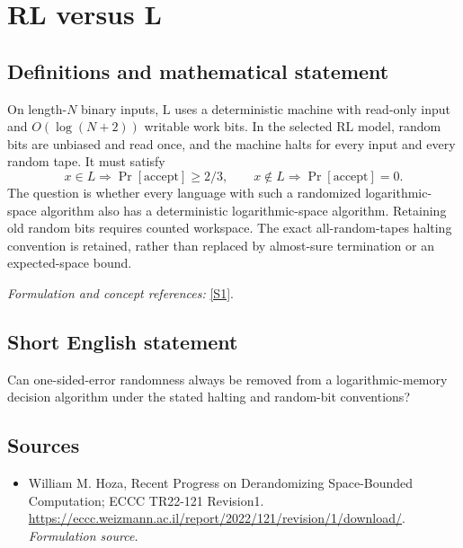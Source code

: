 \documentclass[11pt]{article}
\begin{document}
\section*{\texorpdfstring{RL versus L}{RL versus L}}\label{30006815}
\subsection{Definitions and mathematical statement}
On length-$N$ binary inputs, $\mathrm L$ uses a deterministic machine with read-only input and $O(\log(N+2))$ writable work bits. In the selected $\mathrm{RL}$ model, random bits are unbiased and read once, and the machine halts for every input and every random tape. It must satisfy
\[
 x\in L\Rightarrow\Pr[\mathrm{accept}]\ge2/3,
 \qquad x\notin L\Rightarrow\Pr[\mathrm{accept}]=0.
\]
The question is whether every language with such a randomized logarithmic-space algorithm also has a deterministic logarithmic-space algorithm. Retaining old random bits requires counted workspace. The exact all-random-tapes halting convention is retained, rather than replaced by almost-sure termination or an expected-space bound.
\par\smallskip\textit{Formulation and concept references:} \href{https://eccc.weizmann.ac.il/report/2022/121/revision/1/download/}{[S1]}.

\subsection{Short English statement}
Can one-sided-error randomness always be removed from a logarithmic-memory decision algorithm under the stated halting and random-bit conventions?
\subsection{Sources}
\begin{itemize}
\item[S1]William M. Hoza, Recent Progress on Derandomizing Space-Bounded Computation; ECCC TR22-121 Revision1.
\url{https://eccc.weizmann.ac.il/report/2022/121/revision/1/download/}.
\textit{Formulation source.}
\end{itemize}
\end{document}

